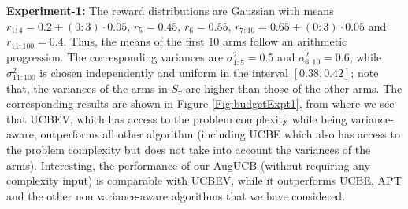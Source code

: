  
 

	
\textbf{Experiment-1:} The reward distributions are Gaussian with  means  $r_{1:4}=0.2+(0:3)\cdot0.05$, $r_{5}=0.45$, $r_{6}=0.55$, $r_{7:10}=0.65+(0:3)\cdot0.05$ and $r_{11:100}=0.4$. Thus, the means of the first $10$ arms follow an arithmetic progression. The corresponding variances are $\sigma_{1:5}^{2}=0.5$ and $\sigma_{6:10}^{2}=0.6$, while $\sigma_{11:100}^{2}$ is chosen independently and uniform in the  interval $[0.38,0.42]$;
note that, the variances of the arms in $S_\tau$ are higher than those of the other arms.
 The corresponding  results are shown in Figure \ref{Fig:budgetExpt1},
 from where we see that UCBEV, which has access to the problem complexity while being variance-aware, outperforms all other algorithm (including UCBE which also has access to the problem complexity but does not take into account the variances of the arms).  Interesting, the performance of our AugUCB (without requiring any complexity input) is comparable with UCBEV, while it 
 outperforms UCBE, APT and the other non variance-aware algorithms that we have considered. 	
	
